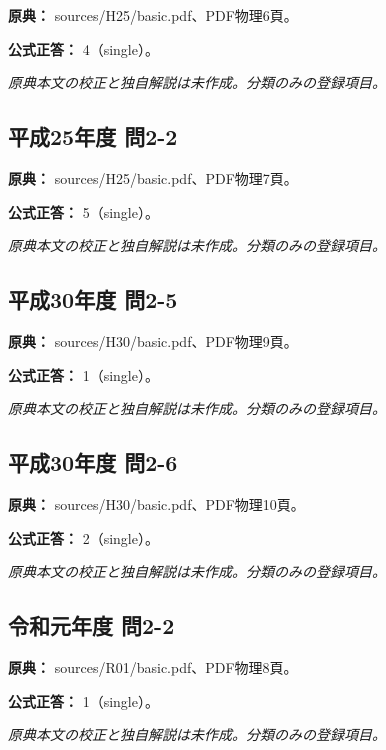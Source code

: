 \noindent\textbf{原典：} sources/H25/basic.pdf、PDF物理6頁。

\textbf{公式正答：} 4（single）。

\par\textit{原典本文の校正と独自解説は未作成。分類のみの登録項目。}

\subsection{平成25年度 問2-2}
\label{q:h25-reg-basic-2-2}

\noindent\textbf{原典：} sources/H25/basic.pdf、PDF物理7頁。

\textbf{公式正答：} 5（single）。

\par\textit{原典本文の校正と独自解説は未作成。分類のみの登録項目。}

\subsection{平成30年度 問2-5}
\label{q:h30-reg-basic-2-5}

\noindent\textbf{原典：} sources/H30/basic.pdf、PDF物理9頁。

\textbf{公式正答：} 1（single）。

\par\textit{原典本文の校正と独自解説は未作成。分類のみの登録項目。}

\subsection{平成30年度 問2-6}
\label{q:h30-reg-basic-2-6}

\noindent\textbf{原典：} sources/H30/basic.pdf、PDF物理10頁。

\textbf{公式正答：} 2（single）。

\par\textit{原典本文の校正と独自解説は未作成。分類のみの登録項目。}

\subsection{令和元年度 問2-2}
\label{q:r01-reg-basic-2-2}

\noindent\textbf{原典：} sources/R01/basic.pdf、PDF物理8頁。

\textbf{公式正答：} 1（single）。

\par\textit{原典本文の校正と独自解説は未作成。分類のみの登録項目。}

